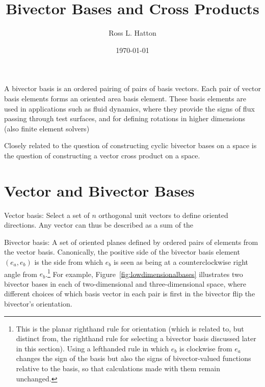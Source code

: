 \documentclass[11pt]{article}
\newcommand{\bv}[1][]{e_{#1}}
\newcommand{\bp}[2]{(#1,#2)}
\begin{document}
\title{Bivector Bases and Cross Products}
\author{Ross L. Hatton}
\date{\today}
\maketitle

A bivector basis is an ordered pairing of pairs of basis vectors. Each pair of vector basis elements forms an oriented area basis element. These basis elements are used in applications such as fluid dynamics, where they provide the signs of flux passing through test surfaces, and for defining rotations in higher dimensions (also finite element solvers)

Closely related to the question of constructing cyclic bivector bases on a space is the question of constructing a vector cross product on a space. 

\section{Vector and Bivector Bases}

Vector basis: Select a set of $n$ orthogonal unit vectors to define oriented directions. Any vector can thus be described as a sum of the 

Bivector basis: A set of oriented planes defined by ordered pairs of elements from the vector basis. Canonically, the positive side of the bivector basis element  $\bp{\bv[a]}{\bv[b]}$ is the side from which $\bv[b]$ is seen as being at a counterclockwise right angle from $\bv[b]$.\footnote{This is the planar righthand rule for orientation (which is related to, but distinct from, the righthand rule for selecting a bivector basis discussed later in this section). Using a lefthanded rule in which $\bv[b]$ is clockwise from $\bv[a]$ changes the sign of the basis but also the signs of bivector-valued functions relative to the basis, so that calculations made with them remain unchanged.} For example, Figure~\ref{fig:lowdimensionalbases} illustrates two bivector bases in each of two-dimensional and three-dimensional space, where different choices of which basis vector in each pair is first in the bivector flip the bivector's orientation.
\end{document}
